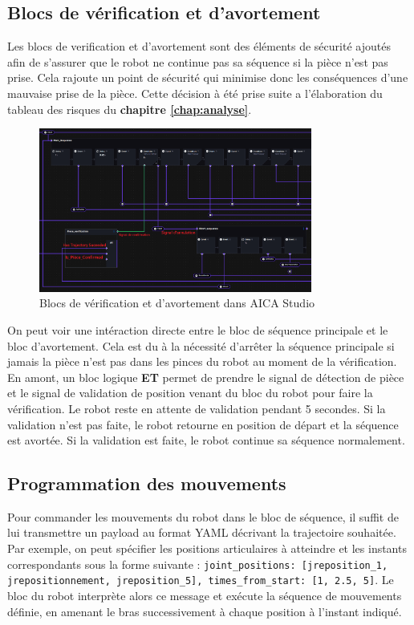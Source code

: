 \subsection{Blocs de vérification et d'avortement}

Les blocs de verification et d'avortement sont des éléments de sécurité ajoutés afin de s'assurer que le robot ne continue pas sa séquence si la pièce n'est pas prise. Cela rajoute un point de sécurité qui minimise donc les conséquences d'une mauvaise prise de la pièce.  Cette décision à été prise suite a l'élaboration du tableau des risques du \textbf{chapitre \ref{chap:analyse}}.

\begin{figure}[H]
    \centering
    \includegraphics[width=0.8\textwidth]{assets/figures/AICA_abort_sequence.png}
    \caption{Blocs de vérification et d'avortement dans AICA Studio}
    \label{fig:verification_block}
\end{figure}

On peut voir une intéraction directe entre le bloc de séquence principale et le bloc d'avortement. Cela est du à la nécessité d'arrêter la séquence principale si jamais la pièce n'est pas dans les pinces du robot au moment de la vérification. En amont, un bloc logique \textbf{ET} permet de prendre le signal de détection de pièce et le signal de validation de position venant du bloc du robot pour faire la vérification. Le robot reste en attente de validation pendant 5 secondes. Si la validation n'est pas faite, le robot retourne en position de départ et la séquence est avortée. Si la validation est faite, le robot continue sa séquence normalement.

\subsection{Programmation des mouvements}

Pour commander les mouvements du robot dans le bloc de séquence, il suffit de lui transmettre un \gls{payload} au format YAML décrivant la trajectoire souhaitée. Par exemple, on peut spécifier les positions articulaires à atteindre et les instants correspondants sous la forme suivante :
\texttt{{joint\_positions: [jreposition\_1, jrepositionnement, jreposition\_5], times\_from\_start: [1, 2.5, 5]}}.
Le bloc du robot interprète alors ce message et exécute la séquence de mouvements définie, en amenant le bras successivement à chaque position à l’instant indiqué.

